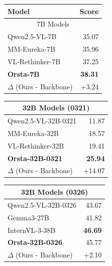 \begin{table}[t]
\centering

\begin{minipage}[t]{0.29\linewidth}
\vspace{0pt}
\centering

\label{tab:mega_bench_core}

\small
\setlength{\tabcolsep}{2pt}

\begin{tabular}{@{}lr@{}}
\toprule
Model & Score \\
\midrule
\multicolumn{2}{c}{7B Models} \\
\midrule
Qwen2.5-VL-7B      & 35.07 \\
MM-Eureka-7B       & 35.96 \\
VL-Rethinker-7B    & 37.25 \\
\textbf{Orsta-7B}  & \textbf{38.31} \\
$\Delta$ (Ours - Backbone) & +3.24 \\
\bottomrule
\end{tabular}

\vspace{5pt}

\begin{tabular}{@{}lr@{}}
\toprule
\multicolumn{2}{c}{32B Models (0321)} \\
\midrule
Qwen2.5-VL-32B-0321     & 11.87 \\
MM-Eureka-32B           & 18.57 \\
VL-Rethinker-32B        & 19.41 \\
\textbf{Orsta-32B-0321} & \textbf{25.94} \\
$\Delta$ (Ours - Backbone) & +14.07 \\
\bottomrule
\end{tabular}

\vspace{5pt}

\begin{tabular}{@{}lr@{}}
\toprule
\multicolumn{2}{c}{32B Models (0326)} \\
\midrule
Qwen2.5-VL-32B-0326     & 43.67 \\
Gemma3-27B              & 41.82 \\
InternVL-3-38B          & \textbf{46.69} \\
\textbf{Orsta-32B-0326} & 45.77 \\
$\Delta$ (Ours - Backbone) & +2.10 \\
\bottomrule
\end{tabular}


\end{minipage}
\end{table}
